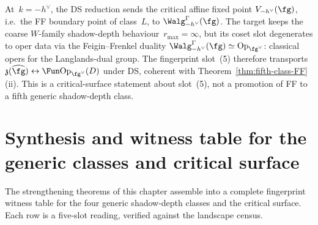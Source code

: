 \begin{remark}[DS transport at~$\kappa_{\mathrm{ch}} = 0$]
\label{rem:DS-at-critical}
At~$k = -h^\vee$, the DS reduction sends the critical affine fixed point
$V_{-h^\vee}(\fg)$, i.e.\ the FF boundary point of class~$L$, to
$\Walg^\Gamma_{-h^\vee}(\fg)$. The target keeps the coarse
$W$-family shadow-depth behaviour~$r_{\max}=\infty$, but its coset slot
degenerates to oper data via the Feigin--Frenkel duality
$\Walg^\Gamma_{-h^\vee}(\fg) \simeq \mathrm{Op}_{\fg^\vee}$: classical
opers for the Langlands-dual group. The fingerprint slot~(5)
therefore transports~$\mathfrak{z}(\widehat{\fg}) \leftrightarrow \Fun\mathrm{Op}_{\fg^\vee}(D)$
under DS, coherent with
Theorem~\ref{thm:fifth-class-FF}(ii). This is a critical-surface
statement about slot~(5), not a
promotion of FF to a fifth generic shadow-depth class.
\end{remark}

\section{Synthesis and witness table for the generic classes and critical surface}
\label{sec:five-class-witness}

The strengthening theorems of this chapter assemble into a complete
fingerprint witness table for the four generic shadow-depth classes
and the critical surface. Each row is a five-slot reading, verified
against the landscape census.

